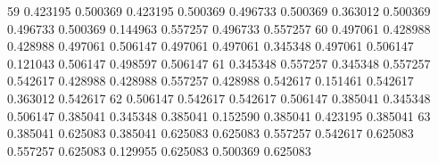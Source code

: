 {   59    0.423195     0.500369    0.423195    0.500369              0.496733             0.500369           0.363012             0.500369                0.496733                0.500369               0.144963              0.557257               0.496733                0.557257
   60    0.497061     0.428988    0.428988    0.497061              0.506147             0.497061           0.497061             0.345348                0.497061                0.506147               0.121043              0.506147               0.498597                0.506147
   61    0.345348     0.557257    0.345348    0.557257              0.542617             0.428988           0.428988             0.557257                0.428988                0.542617               0.151461              0.542617               0.363012                0.542617
   62    0.506147     0.542617    0.542617    0.506147              0.385041             0.345348           0.506147             0.385041                0.345348                0.385041               0.152590              0.385041               0.423195                0.385041
   63    0.385041     0.625083    0.385041    0.625083              0.625083             0.557257           0.542617             0.625083                0.557257                0.625083               0.129955              0.625083               0.500369                0.625083
}\SavingsFF


